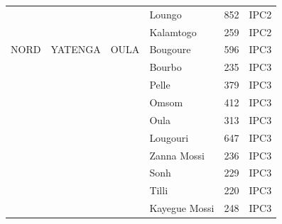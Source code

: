 \begin{table}[!ht]
\begin{tabular}{llllll}
        ~ & ~ & ~ & Loungo & 852 & IPC2 \\ 
        ~ & ~ & ~ & Kalamtogo & 259 & IPC2 \\ 
        NORD & YATENGA & OULA & Bougoure & 596 & IPC3 \\ 
        ~ & ~ & ~ & Bourbo & 235 & IPC3 \\ 
        ~ & ~ & ~ & Pelle & 379 & IPC3 \\ 
        ~ & ~ & ~ & Omsom & 412 & IPC3 \\ 
        ~ & ~ & ~ & Oula & 313 & IPC3 \\ 
        ~ & ~ & ~ & Lougouri & 647 & IPC3 \\ 
        ~ & ~ & ~ & Zanna Mossi & 236 & IPC3 \\ 
        ~ & ~ & ~ & Sonh & 229 & IPC3 \\ 
        ~ & ~ & ~ & Tilli & 220 & IPC3 \\ 
        ~ & ~ & ~ & Kayegue Mossi & 248 & IPC3 \\ \hline\hline 
    \end{tabular}
\end{table}